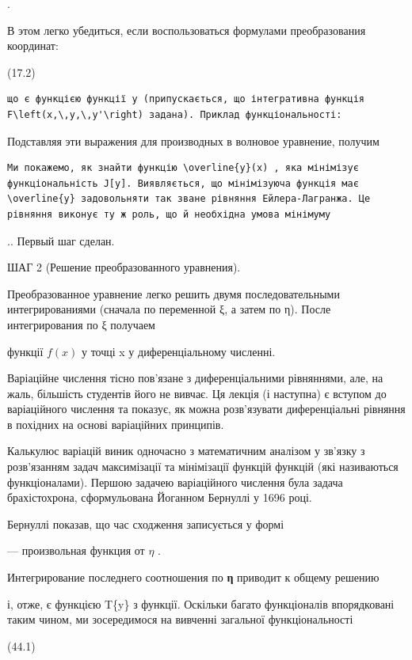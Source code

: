 \documentclass[
  ukrainian,
]{article}
\begin{document}
.

В этом легко убедиться, если воспользоваться формулами преобразования
координат:

(17.2)

\begin{verbatim}
що є функцією функції y (припускається, що інтегративна функція F\left(x,\,y,\,y'\right) задана). Приклад функціональності:
\end{verbatim}

Подставляя эти выражения для производных в волновое уравнение, получим

\begin{verbatim}
Ми покажемо, як знайти функцію \overline{y}(x) , яка мінімізує функціональність J[y]. Виявляється, що мінімізуюча функція має \overline{y} задовольняти так зване рівняння Ейлера-Лагранжа. Це рівняння виконує ту ж роль, що й необхідна умова мінімуму
\end{verbatim}

.. Первый шаг сделан.

ШАГ 2 (Решение преобразованного уравнения).

Преобразованное уравнение легко решить двумя последовательными
интегрированиями (сначала по переменной ξ, а затем по η). После
интегрирования по ξ получаем

функції \(f(x)\) у точці x у диференціальному численні.

Варіаційне числення тісно пов'язане з диференціальними рівняннями, але,
на жаль, більшість студентів його не вивчає. Ця лекція (і наступна) є
вступом до варіаційного числення та показує, як можна розв'язувати
диференціальні рівняння в похідних на основі варіаційних принципів.

Калькулюс варіацій виник одночасно з математичним аналізом у зв'язку з
розв'язанням задач максимізації та мінімізації функцій функцій (які
називаються функціоналами). Першою задачею варіаційного числення була
задача брахістохрона, сформульована Йоганном Бернуллі у 1696 році.

Бернуллі показав, що час сходження записується у формі

--- произвольная функция от \(\eta\) .

Интегрирование последнего соотношения по \textbf{η} приводит к общему
решению

і, отже, є функцією T\{y\} з функції. Оскільки багато функціоналів
впорядковані таким чином, ми зосередимося на вивченні загальної
функціональності

(44.1)
\end{document}
